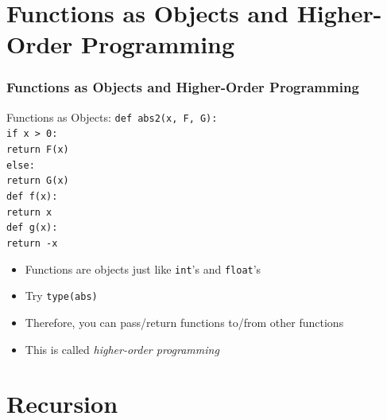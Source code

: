 \documentclass{beamer}
\newcommand{\code}[1]{\texttt{#1}}
\newcommand{\tab}{\hspace*{22pt}}
\begin{document}
\section{Functions as Objects and Higher-Order Programming}

\begin{frame}	
\end{frame}

\begin{frame}%
	\frametitle{Functions as Objects and Higher-Order Programming}
	
	\begin{block}{Functions as Objects:}
			\code{def abs2(x, F, G): \\
					\tab if x > 0: \\
					\tab \tab return F(x) \\
					\tab else: \\
					\tab \tab return G(x) \\
					def f(x): \\
					\tab return x \\
					def g(x): \\
					\tab return -x \\
			}
		\endminipage\hfill
			\begin{itemize}
				\item Functions are objects just like \code{int}'s and \code{float}'s
				\item Try \code{type(abs)}
				\item Therefore, you can pass/return functions to/from other functions
				\item This is called \emph{higher-order programming}
			\end{itemize}
		\endminipage\hfill
	\end{block}
	
\end{frame}


\section{Recursion}

\begin{frame}	
\end{frame}
\end{document}
